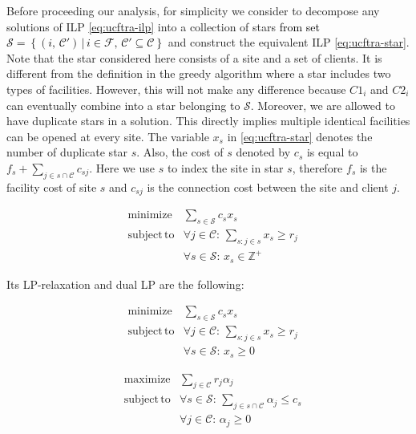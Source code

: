 \documentclass[10pt]{llncs}
\begin{document}
Before proceeding our analysis, for simplicity we consider to decompose
any solutions of ILP \eqref{eq:ucftra-ilp} into a collection of stars\textcolor{black}{{}
from set $\mathcal{S}=\left\{ \left(i,\,\mathcal{C}'\right)\,|\, i\in\mathcal{F},\,\mathcal{C}'\subseteq\mathcal{C}\right\} $}
and construct the equivalent ILP \eqref{eq:ucftra-star}. Note that
the star considered here consists of a site and a set of clients.
It is different from the definition in the greedy algorithm where
a star includes two types of facilities. However, this will not make
any difference because $C1_{i}$ and $C2_{i}$ can eventually combine
into a star belonging to $\mathcal{S}$. Moreover, we are allowed
to have duplicate stars in a solution. This directly implies multiple
identical facilities can be opened at every site. The variable $x_{s}$
in \eqref{eq:ucftra-star} denotes the number of duplicate star $s$.
Also, the cost of $s$ denoted by $c_{s}$ is equal to $f_{s}+\sum_{j\in s\cap\mathcal{C}}c_{sj}$.
Here we use $s$ to index the site in star $s$, therefore $f_{s}$
is the facility cost of site $s$ and $c_{sj}$ is the connection
cost between the site and client $j$.

\begin{eqnarray}
 & \mathrm{minimize} & {\displaystyle \sum_{s\in\mathcal{S}}c_{s}x_{s}}\nonumber \\
 & \mathrm{subject\, to} & \forall j\in\mathcal{C}:\,{\displaystyle \sum_{s:j\in s}x_{s}\geq r_{j}}\label{eq:ucftra-star}\\
 &  & \forall s\in\mathcal{S}:\, x_{s}\in\mathbb{Z}^{+}\nonumber \end{eqnarray}


Its LP-relaxation and dual LP are the following:

\setlength{\columnsep}{2pt}
\begin{multicols}{2}

\begin{eqnarray}
 & \mathrm{minimize} & {\displaystyle \sum_{s\in\mathcal{S}}c_{s}x_{s}}\nonumber \\
 & \mathrm{subject\, to} & \forall j\in\mathcal{C}:\,{\displaystyle \sum_{s:j\in s}x_{s}\geq r_{j}}\label{eq:ucftra-star-relax}\\
 &  & \forall s\in\mathcal{S}:\, x_{s}\geq0\nonumber \end{eqnarray}


\columnbreak 

\begin{eqnarray}
 & \textrm{maximize} & {\displaystyle \sum_{j\in\mathcal{C}}r_{j}\alpha_{j}}\nonumber \\
 & \mathrm{subject\, to} & \forall s\in\mathcal{S}:\,{\displaystyle \sum_{j\in s\cap\mathcal{C}}\alpha_{j}\leq c_{s}}\label{eq:ucftra-star-dual}\\
 &  & \forall j\in\mathcal{C}:\,\alpha_{j}\geq0\nonumber \end{eqnarray}


\end{multicols}
\end{document}
